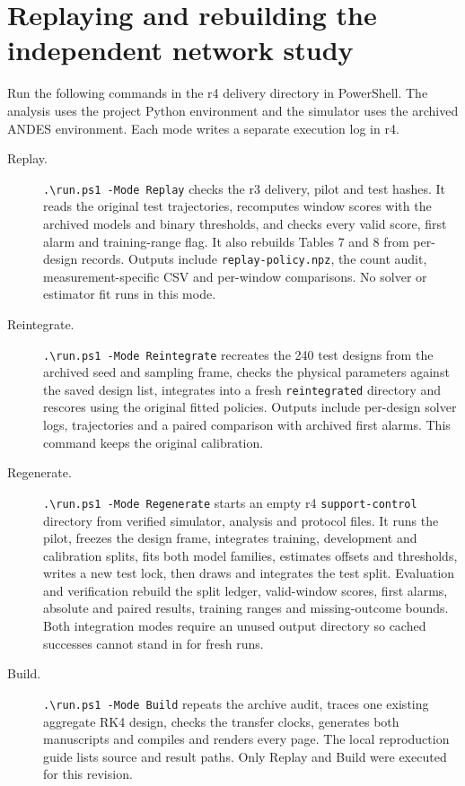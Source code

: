 \documentclass[10pt]{article}
\begin{document}
\section{Replaying and rebuilding the independent network study}
Run the following commands in the r4 delivery directory in PowerShell. The analysis uses the project Python environment and the simulator uses the archived ANDES environment. Each mode writes a separate execution log in r4.
\begin{description}
\item[Replay.] \verb|.\run.ps1 -Mode Replay| checks the r3 delivery, pilot and test hashes. It reads the original test trajectories, recomputes window scores with the archived models and binary thresholds, and checks every valid score, first alarm and training-range flag. It also rebuilds Tables 7 and 8 from per-design records. Outputs include \texttt{replay-policy.npz}, the count audit, measurement-specific CSV and per-window comparisons. No solver or estimator fit runs in this mode.
\item[Reintegrate.] \verb|.\run.ps1 -Mode Reintegrate| recreates the 240 test designs from the archived seed and sampling frame, checks the physical parameters against the saved design list, integrates into a fresh \texttt{reintegrated} directory and rescores using the original fitted policies. Outputs include per-design solver logs, trajectories and a paired comparison with archived first alarms. This command keeps the original calibration.
\item[Regenerate.] \verb|.\run.ps1 -Mode Regenerate| starts an empty r4 \texttt{support-control} directory from verified simulator, analysis and protocol files. It runs the pilot, freezes the design frame, integrates training, development and calibration splits, fits both model families, estimates offsets and thresholds, writes a new test lock, then draws and integrates the test split. Evaluation and verification rebuild the split ledger, valid-window scores, first alarms, absolute and paired results, training ranges and missing-outcome bounds. Both integration modes require an unused output directory so cached successes cannot stand in for fresh runs.
\item[Build.] \verb|.\run.ps1 -Mode Build| repeats the archive audit, traces one existing aggregate RK4 design, checks the transfer clocks, generates both manuscripts and compiles and renders every page. The local reproduction guide lists source and result paths. Only Replay and Build were executed for this revision.
\end{description}
\end{document}

